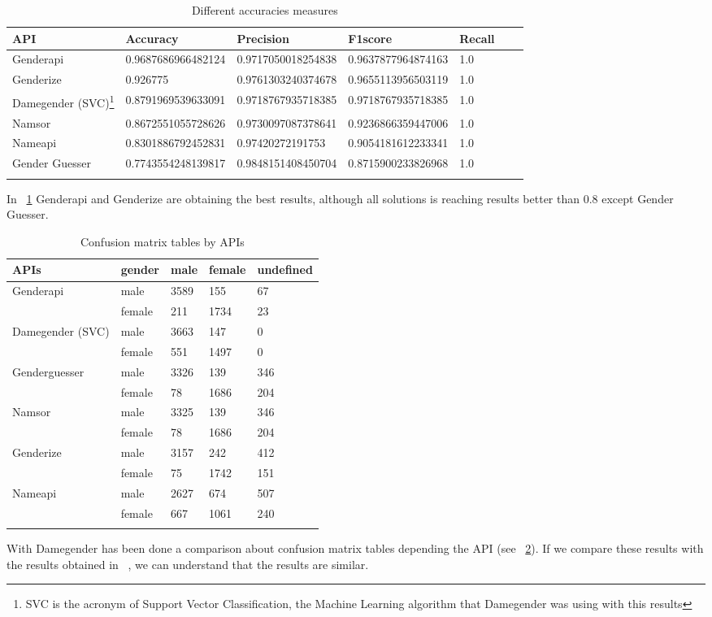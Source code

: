 \documentclass[fleqn,10pt]{wlpeerj} %
\begin{document}
\begin{longtable}[]{@{}lllllll@{}}
  \toprule
  API & Accuracy & Precision & F1score & Recall\tabularnewline
\midrule
\endhead
Genderapi & 0.9687686966482124 & 0.9717050018254838 & 0.9637877964874163 & 1.0\tabularnewline
Genderize & 0.926775 & 0.9761303240374678 & 0.9655113956503119 & 1.0\tabularnewline
Damegender (SVC)\footnote{SVC is the acronym of Support Vector Classification, the Machine Learning algorithm that Damegender was using with this results} & 0.8791969539633091 & 0.9718767935718385 & 0.9718767935718385 & 1.0\tabularnewline
Namsor & 0.8672551055728626 & 0.9730097087378641 & 0.9236866359447006 & 1.0\tabularnewline
Nameapi & 0.8301886792452831 & 0.97420272191753 & 0.9054181612233341 & 1.0\tabularnewline
Gender Guesser & 0.7743554248139817 & 0.9848151408450704 & 0.8715900233826968 & 1.0\tabularnewline
\bottomrule
\caption{Different accuracies measures}
\label{table:DifferentAccuraciesMeasures}
\end{longtable}

In ~\ref{table:DifferentAccuraciesMeasures} Genderapi and Genderize
are obtaining the best results, although all solutions is reaching
results better than 0.8 except Gender Guesser.

\begin{longtable}[]{@{}lllll@{}}
  \toprule
  APIs          & gender & male & female & undefined \tabularnewline
\midrule
\endhead
Genderapi         & male    & 3589 & 155  &  67 \tabularnewline
                  & female  & 211  & 1734 &  23 \tabularnewline
Damegender (SVC)\footnotemark[1]  & male    & 3663 & 147  &   0 \tabularnewline
                  & female  & 551  & 1497 &   0 \tabularnewline
Genderguesser     & male    & 3326 &  139 & 346 \tabularnewline
                  & female  & 78   & 1686 & 204 \tabularnewline
Namsor            & male    & 3325 & 139  & 346 \tabularnewline
                  & female  & 78   & 1686 & 204 \tabularnewline
Genderize         & male    & 3157 & 242  & 412 \tabularnewline
                  & female  & 75   & 1742 & 151 \tabularnewline
Nameapi           & male    & 2627 & 674  & 507 \tabularnewline
                  & female  & 667  & 1061 & 240 \tabularnewline 
\bottomrule
\caption{Confusion matrix tables by APIs}
\label{table:ConfusionMatrixTables}
\end{longtable}

With Damegender has been done a comparison about confusion matrix
tables depending the API (see ~\ref{table:ConfusionMatrixTables}). If
we compare these results with the results obtained in
~\cite{10.7717/peerj-cs.156}, we can understand that the results are
similar.
\end{document}
